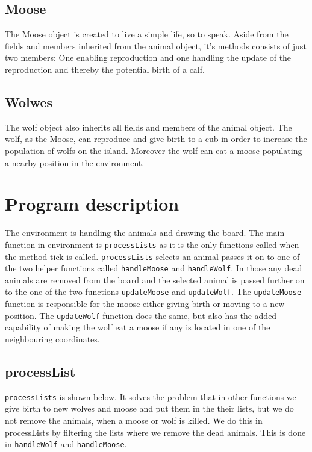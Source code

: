\documentclass[a4paper]{report}
\begin{document}
\subsection{Moose}
The Moose object is created to live a simple life, so to speak. Aside from the fields and members inherited from the animal object, it's methods consists of just two members: One enabling reproduction and one handling the update of the reproduction and thereby the potential birth of a calf.

\subsection{Wolwes}
The wolf object also inherits all fields and members of the animal object. The wolf, as the Moose, can reproduce and give birth to a cub in order to increase the population of wolfs on the island. Moreover the wolf can eat a moose populating a nearby position in the environment. 

\section{Program description}

The environment is handling the animals and drawing the board. The main function in environment is \texttt{processLists}  as it is the only functions called when the method tick is called.
\texttt{processLists} selects an animal passes it on to one of the two helper functions called \texttt{handleMoose}  and \texttt{handleWolf}. In those any dead animals are removed from the board and the selected animal is passed further on to the one of the two functions \texttt{updateMoose} and \texttt{updateWolf}. The \texttt{updateMoose} function is responsible for the moose either giving birth or moving to a new position.
The \texttt{updateWolf} function does the same, but also has the added capability of making the wolf eat a moose if any is located in one of the neighbouring coordinates.

\subsection{processList}
\texttt{processLists} is shown below. It solves the problem that in other functions we give birth to new wolves and moose and put them in the their lists, but we do not remove the animals, when a moose or wolf is killed. We do this in processLists by filtering the lists where we remove the dead animals. This is done  in \texttt{handleWolf} and \texttt{handleMoose}. 
\end{document}

